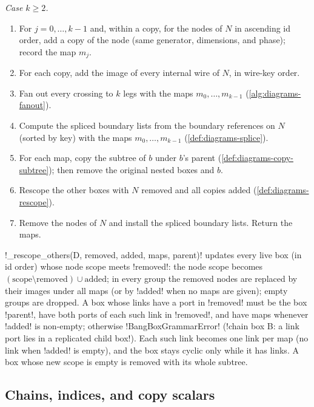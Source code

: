 \begin{algorithm}
\emph{Case $k\ge 2$.}
\begin{enumerate}
\item For $j=0,\dots,k-1$ and, within a copy, for the nodes of $N$ in ascending id order, add a copy of the node (same generator, dimensions, and phase); record the map $m_j$.
\item For each copy, add the image of every internal wire of $N$, in wire-key order.
\item Fan out every crossing to $k$ legs with the maps $m_0,\dots,m_{k-1}$ (\cref{alg:diagrams-fanout}).
\item Compute the spliced boundary lists from the boundary references on $N$ (sorted by key) with the maps $m_0,\dots,m_{k-1}$ (\cref{def:diagrams-splice}).
\item For each map, copy the subtree of $b$ under $b$'s parent (\cref{def:diagrams-copy-subtree}); then remove the original nested boxes and $b$.
\item Rescope the other boxes with $N$ removed and all copies added (\cref{def:diagrams-rescope}).
\item Remove the nodes of $N$ and install the spliced boundary lists. Return the maps.
\end{enumerate}
\end{algorithm}

\begin{definition}[Rescoping]\label{def:diagrams-rescope}
\py!_rescope_others(D, removed, added, maps, parent)! updates every live box (in id order) whose node scope meets \py!removed!: the node scope becomes $(\text{scope}\setminus\text{removed})\cup\text{added}$; in every group the removed nodes are replaced by their images under all maps (or by \py!added! when no maps are given); empty groups are dropped. A box whose links have a port in \py!removed! must be the box \py!parent!, have both ports of each such link in \py!removed!, and have maps whenever \py!added! is non-empty; otherwise \py!BangBoxGrammarError! (\code!chain box B: a link port lies in a replicated child box!). Each such link becomes one link per map (no link when \py!added! is empty), and the box stays cyclic only while it has links. A box whose new scope is empty is removed with its whole subtree.
\end{definition}

\subsection{Chains, indices, and copy scalars}

